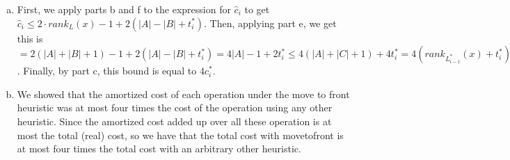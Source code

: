 \documentclass{article}
\begin{document}
\begin{enumerate}[a.]
\item
First, we apply parts b and f to the expression for $\hat{c}_i$ to get $\hat{c}_i \le 2\cdot rank_{L}(x) -1 + 2(|A|-|B|+t_i^*)$. Then, applying part e, we get this is $= 2(|A|+|B|+1) - 1+ 2(|A|-|B|+t_i^*) = 4|A| -1+2t_i^*\le 4(|A|+|C|+1) +4t_i^* = 4(rank_{L_{i-1}^*}(x) + t_i^*)$. Finally, by part c, this bound is equal to $4c_i^*$.
\item
We showed that the amortized cost of each operation under the move to front heuristic was at most four times the cost of the operation using any other heuristic. Since the amortized cost added up over all these operation is at most the total (real) cost, so we have that the total cost with movetofront is at most four times the total cost with an arbitrary other heuristic.

\end{enumerate}
\end{document}
